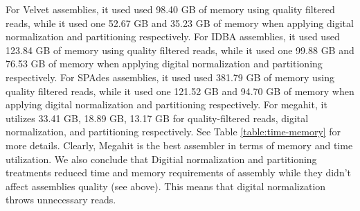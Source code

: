  For Velvet assemblies, it used used 98.40 GB of memory using quality filtered reads, while it used one 52.67 GB and  35.23 GB of memory when applying digital normalization and partitioning respectively. For IDBA assemblies, it used used 123.84 GB of memory using quality filtered reads, while it used one 99.88 GB and 76.53 GB of memory when applying digital normalization and partitioning respectively. For SPAdes assemblies, it used used 381.79 GB of memory using quality filtered reads, while it used one 121.52 GB and 94.70 GB of memory when applying digital normalization and partitioning respectively.  For megahit, it utilizes 33.41 GB, 18.89 GB,  13.17 GB for quality-filtered reads, digital normalization, and partitioning respectively. See Table \ref{table:time-memory} for more details. 
Clearly, Megahit is the best assembler in terms of memory and time utilization. We also conclude that Digitial normalization and partitioning treatments reduced time and memory requirements of assembly while they didn't affect assemblies quality (see above). This means that digital normalization throws unnecessary reads. 


 


